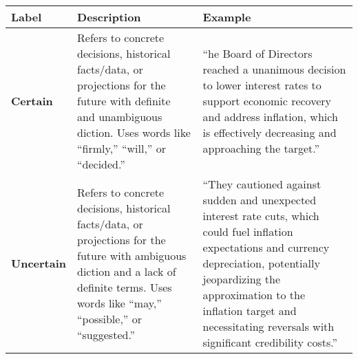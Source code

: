 \begin{table*}
    \caption{}
    \vspace{1em}
    \begin{tabular}{p{}p{}p{}}
    \toprule
    \textbf{Label} & \textbf{Description} & \textbf{Example}\\
    \midrule
    \textbf{Certain} & Refers to concrete decisions, historical facts/data, or projections for the future with definite and unambiguous diction. Uses words like ``firmly,'' ``will,'' or ``decided.'' & ``he Board of Directors reached a unanimous decision to lower interest rates to support economic recovery and address inflation, which is effectively decreasing and approaching the target.''\\
    \midrule
    \textbf{Uncertain} & Refers to concrete decisions, historical facts/data, or projections for the future with ambiguous diction and a lack of definite terms. Uses words like ``may,'' ``possible,'' or ``suggested.'' & ``They cautioned against sudden and unexpected interest rate cuts, which could fuel inflation expectations and currency depreciation, potentially jeopardizing the approximation to the inflation target and necessitating reversals with significant credibility costs.'' \\
    \bottomrule
    \end{tabular}
    \label{tb:banrep_certainty_guide}
\end{table*}